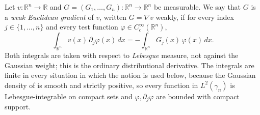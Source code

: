 \begin{definition}
Let $v : \mathbb{R}^n \to \mathbb{R}$ and
$G = (G_1,\ldots,G_n) : \mathbb{R}^n \to \mathbb{R}^n$ be measurable.  We say that
$G$ is a \emph{weak Euclidean gradient} of $v$, written $G = \nabla v$ weakly, if
for every index $j \in \{1,\ldots,n\}$ and every test function
$\varphi \in C_c^\infty(\mathbb{R}^n)$,
\[
  \int_{\mathbb{R}^n} v(x)\, \partial_j \varphi(x)\, dx
    = -\int_{\mathbb{R}^n} G_j(x)\, \varphi(x)\, dx .
\]
Both integrals are taken with respect to \emph{Lebesgue} measure, not against the
Gaussian weight; this is the ordinary distributional derivative.  The integrals are
finite in every situation in which the notion is used below, because the Gaussian
density of  is smooth and strictly positive, so every
function in $L^2(\gamma_n)$ is Lebesgue-integrable on compact sets and
$\varphi, \partial_j\varphi$ are bounded with compact support.
\end{definition}
